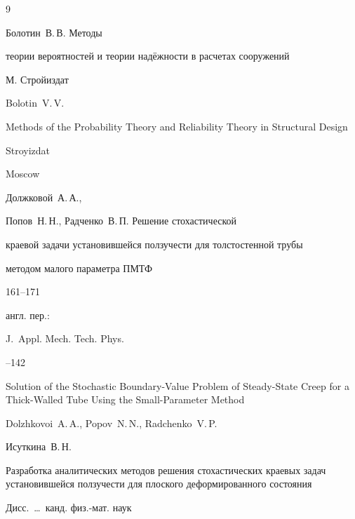 \begin{thebibliography}{9}



 \by Болотин~В.\,В. \book Методы

теории вероятностей и теории надёжности в расчетах сооружений

\publaddr М. \publ Стройиздат  

\misctransl

\by Bolotin~V.\,V.

\book Methods of the Probability Theory and Reliability Theory in Structural Design

\publ Stroyizdat

\publaddr Moscow






\by Должковой~А.\,А.,

Попов~Н.\,Н., Радченко~В.\,П. \paper Решение стохастической

краевой задачи установившейся ползучести для толстостенной трубы

методом малого параметра \jour ПМТФ    \pages

161--171

\transl англ. пер.:~

\jour J.~Appl. Mech. Tech. Phys.




--142


\paper Solution of the Stochastic Boundary-Value Problem of Steady-State Creep for a Thick-Walled Tube Using the Small-Parameter Method

\by Dolzhkovoi~A.\,A., Popov~N.\,N., Radchenko~V.\,P.






\by Исуткина~В.\,Н. 

\thesis Разработка аналитических методов решения стохастических краевых задач установившейся ползучести для плоского деформированного состояния 

\thesisinfo Дисс.~\dots\ канд. физ.-мат. наук 


\end{thebibliography}
